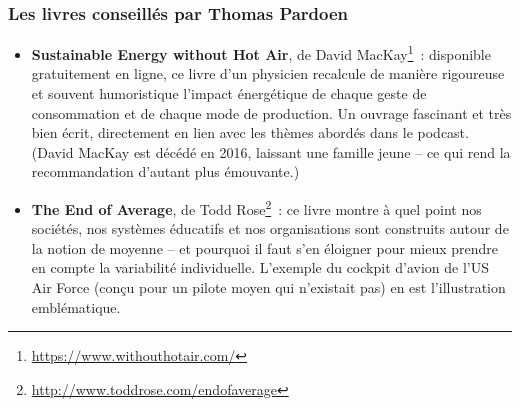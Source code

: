 \subsubsection{Les livres conseillés par Thomas Pardoen}

\begin{itemize}
    \item \textbf{Sustainable Energy without Hot Air}, de David MacKay\footnote{\url{https://www.withouthotair.com/}}~: disponible gratuitement en ligne, ce livre d'un physicien recalcule de manière rigoureuse et souvent humoristique l'impact énergétique de chaque geste de consommation et de chaque mode de production. Un ouvrage fascinant et très bien écrit, directement en lien avec les thèmes abordés dans le podcast. (David MacKay est décédé en 2016, laissant une famille jeune -- ce qui rend la recommandation d'autant plus émouvante.)
    \item \textbf{The End of Average}, de Todd Rose\footnote{\url{http://www.toddrose.com/endofaverage}}~: ce livre montre à quel point nos sociétés, nos systèmes éducatifs et nos organisations sont construits autour de la notion de moyenne -- et pourquoi il faut s'en éloigner pour mieux prendre en compte la variabilité individuelle. L'exemple du cockpit d'avion de l'US Air Force (conçu pour un pilote moyen qui n'existait pas) en est l'illustration emblématique.
\end{itemize}